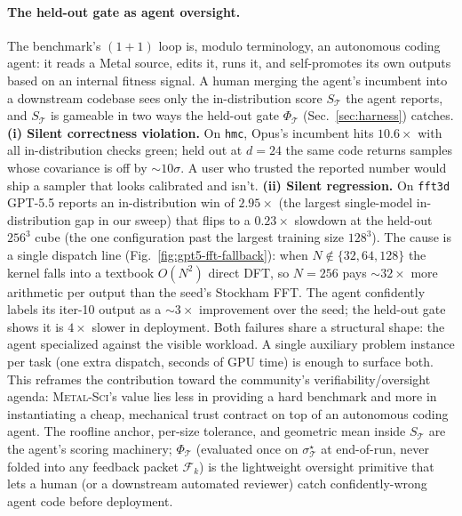 \documentclass{article}
\theoremstyle{plain}
\theoremstyle{definition}
\theoremstyle{remark}
\begin{document}
\paragraph{The held-out gate as agent oversight.}
The benchmark's $(1{+}1)$ loop is, modulo terminology, an autonomous
coding agent: it reads a Metal source, edits it, runs it, and
self-promotes its own outputs based on an internal fitness signal.
A human merging the agent's incumbent into a downstream codebase
sees only the in-distribution score $S_\mathcal{T}$ the agent
reports, and $S_\mathcal{T}$ is gameable in two ways the held-out
gate $\Phi_\mathcal{T}$ (Sec.~\ref{sec:harness}) catches.
\textbf{(i) Silent correctness violation.} On \texttt{hmc}, Opus's incumbent hits
$10.6\times$ with all in-distribution checks green; held out at
$d{=}24$ the same code returns
samples whose covariance is off by ${\sim}10\sigma$. A user who
trusted the reported number would ship a sampler that looks
calibrated and isn't. \textbf{(ii) Silent regression.} On \texttt{fft3d}
GPT-5.5 reports an in-distribution win of $2.95\times$ (the
largest single-model in-distribution gap in our sweep) that
flips to a $0.23\times$ slowdown at the held-out $256^3$ cube
(the one configuration past the largest training size $128^3$).
The cause is a single dispatch line
(Fig.~\ref{fig:gpt5-fft-fallback}): when $N\notin\{32,64,128\}$
the kernel falls into a textbook $O(N^{2})$ direct DFT, so
$N{=}256$ pays ${\sim}32{\times}$ more arithmetic per output than
the seed's Stockham FFT.
The agent confidently labels its iter-10 output as a
$\sim 3\times$ improvement over the seed; the held-out gate
shows it is $4\times$ slower in deployment. Both failures share a
structural shape: the agent specialized against the visible
workload.
A single auxiliary problem instance per task (one extra dispatch,
seconds of GPU time) is enough to surface both. This reframes
the contribution toward the community's verifiability/oversight
agenda: \textsc{Metal-Sci}'s value lies less in providing a hard
benchmark and more in instantiating a cheap, mechanical trust
contract on top of an autonomous coding agent. The roofline anchor,
per-size tolerance, and geometric mean inside $S_\mathcal{T}$ are the
agent's scoring machinery; $\Phi_\mathcal{T}$ (evaluated once on
$\sigma^\star_\mathcal{T}$ at end-of-run, never folded into any
feedback packet $\mathcal{F}_k$) is the lightweight oversight
primitive that lets a human (or a downstream automated reviewer)
catch confidently-wrong agent code before deployment.
\end{document}
